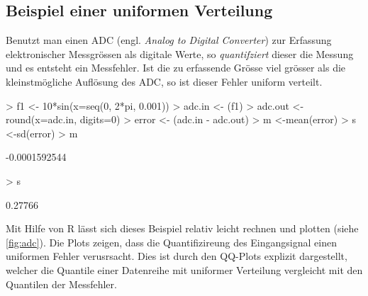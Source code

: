 \clearpage
\subsection{Beispiel einer uniformen Verteilung}
Benutzt man einen ADC (engl. \emph{Analog to Digital Converter}) zur 
Erfassung elektronischer Messgrössen als digitale Werte, so 
\emph{quantifziert} dieser die Messung und es entsteht ein Messfehler. 
Ist die zu erfassende Grösse viel grösser als die kleinstmögliche 
Auflösung des ADC, so ist dieser Fehler uniform verteilt.

\begin{Schunk}
\begin{Sinput}
> f1 <- 10*sin(x=seq(0, 2*pi, 0.001))
> adc.in  <- (f1)
> adc.out <- round(x=adc.in, digits=0)
> error   <- (adc.in - adc.out)
> m <-mean(error)
> s <-sd(error)
> m
\end{Sinput}
\begin{Soutput}
[1] -0.0001592544
\end{Soutput}
\begin{Sinput}
> s
\end{Sinput}
\begin{Soutput}
[1] 0.27766
\end{Soutput}
\end{Schunk}

Mit Hilfe von R lässt sich dieses Beispiel relativ leicht rechnen und
plotten (siehe \ref{fig:adc}). Die Plots zeigen, dass die Quantifizireung
des Eingangsignal einen uniformen Fehler verusrsacht. Dies ist durch
den QQ-Plots explizit dargestellt, welcher die Quantile einer Datenreihe
mit uniformer Verteilung vergleicht mit den Quantilen der Messfehler.





